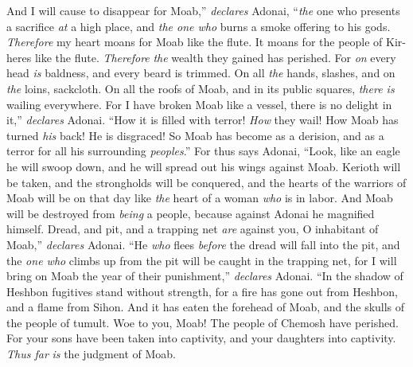 \begin{biblechapter}
\verse And I will cause to disappear for Moab,” \textit{declares} Adonai, 
“\textit{the} one who presents a sacrifice \textit{at} a high place, 
and \textit{the one who} burns a smoke offering to his gods.
\verse \textit{Therefore} my heart moans for Moab like the flute. 
It moans for the people of Kir-heres like the flute. 
\textit{Therefore} \textit{the} wealth they gained has perished.
\verse For \textit{on} every head \textit{is} baldness, 
and every beard is trimmed. 
On all \textit{the} hands, slashes, 
and on \textit{the} loins, sackcloth.
\verse On all the roofs of Moab, and in its public squares, 
\textit{there is} wailing everywhere. 
For I have broken Moab like a vessel, 
there is no delight in it,” \textit{declares} Adonai.
\verse “How it is filled with terror! \textit{How} they wail! 
How Moab has turned \textit{his} back! He is disgraced! 
So Moab has become as a derision, 
and as a terror for all his surrounding \textit{peoples}.”
\verse For thus says Adonai,
\verse “Look, like an eagle he will swoop down, 
and he will spread out his wings against Moab.
\verse Kerioth will be taken, 
and the strongholds will be conquered, 
and the hearts of the warriors of Moab will be on that day 
like \textit{the} heart of a woman \textit{who} is in labor.
\verse And Moab will be destroyed from \textit{being} a people, 
because against Adonai he magnified himself.
\verse Dread, and pit, and a trapping net \textit{are} against you, 
O inhabitant of Moab,” \textit{declares} Adonai.
\verse “He \textit{who} flees \textit{before} the dread 
will fall into the pit, 
and the \textit{one who} climbs up from the pit 
will be caught in the trapping net, 
for I will bring on Moab 
the year of their punishment,” \textit{declares} Adonai.
\verse “In the shadow of Heshbon 
fugitives stand without strength, 
for a fire has gone out from Heshbon, 
and a flame from Sihon. 
And it has eaten the forehead of Moab, 
and the skulls of the people of tumult.
\verse Woe to you, Moab! 
The people of Chemosh have perished. 
For your sons have been taken into captivity, 
and your daughters into captivity. \textit{Thus far} \textit{is} the judgment of Moab.
\end{biblechapter}

